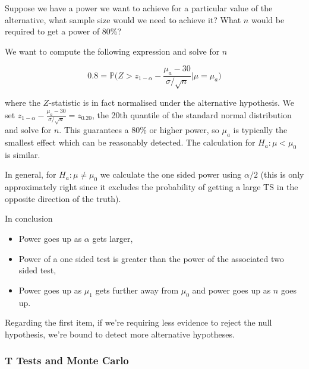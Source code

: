 \documentclass{homework}
\begin{document}
\begin{tcolorbox}[title=Example of a Sample Size Calculation]
Suppose we have a power we want to achieve for a particular value of the alternative, what sample size would we need to achieve it? What $n$ would be required to get a power of 80\%?

We want to compute the following expression and solve for $n$

$$
0.8 = \mathds{P}\bigg(Z > z_{1-\alpha} -\frac{\mu_a-30}{\sigma/\sqrt{n}} \bigg|\mu = \mu_a\bigg)
$$

where the $Z$-statistic is in fact normalised under the alternative hypothesis. We set $z_{1-\alpha} -\frac{\mu_a-30}{\sigma/\sqrt{n}}  = z_{0.20}$, the 20th quantile of the standard normal distribution and solve for $n$. This guarantees a 80\% or higher power, so $\mu_a$ is typically the smallest effect which can be reasonably detected. The calculation for $H_a: \mu < \mu_0$ is similar. 
\end{tcolorbox}

In general, for $H_a : \mu \neq \mu_0$ we calculate the one sided power using $\alpha/2$ (this is only approximately right since it excludes the probability of getting a large TS in the opposite direction of the truth).

In conclusion

\begin{itemize}
    \item Power goes up as $\alpha$ gets larger, \item Power of a one sided test is greater than the power of the associated two sided test,
    \item Power goes up as $\mu_1$ gets further away from $\mu_0$ and power goes up as $n$ goes up.
\end{itemize}

Regarding the first item, if we're requiring less evidence to reject the null hypothesis, we're bound to detect more alternative hypotheses. \\


\subsubsection{T Tests and Monte Carlo}
\end{document}
